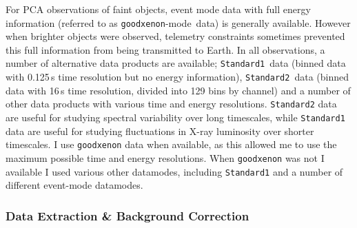 \par For PCA observations of faint objects, event mode data with full energy information (referred to as \texttt{goodxenon}-mode\indexgx\ data) is generally available.  However when brighter objects were observed, telemetry constraints sometimes prevented this full information from being transmitted to Earth.  In all observations, a number of alternative data products are available; \texttt{Standard1}\indexsto\ data (binned data with 0.125\,s time resolution but no energy information), \texttt{Standard2}\indexstt\ data (binned data with 16\,s time resolution, divided into 129 bins by channel) and a number of other data products with various time and energy resolutions.  \texttt{Standard2} data are useful for studying spectral variability over long timescales, while \texttt{Standard1} data are useful for studying fluctuations in X-ray luminosity over shorter timescales.  I use \texttt{goodxenon} data when available, as this allowed me to use the maximum possible time and energy resolutions.  When \texttt{goodxenon} was not I available I used various other datamodes, including \texttt{Standard1} and a number of different event-mode datamodes.

\subsubsection{Data Extraction \& Background Correction}


